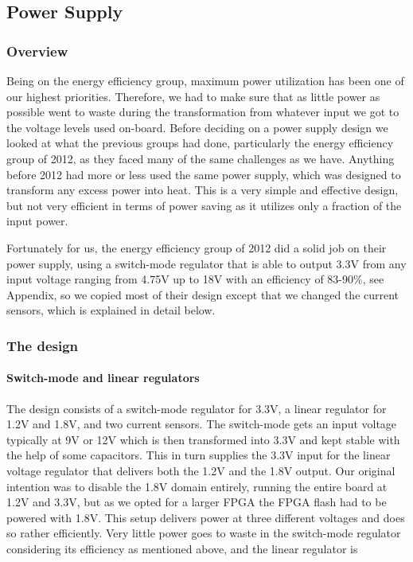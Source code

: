 \subsection{Power Supply}
\subsubsection{Overview}
Being on the energy efficiency group, maximum power utilization has been one of
our highest priorities. Therefore, we had to make sure that as little power as
possible went to waste during the transformation from whatever input we got to
the voltage levels used on-board. Before deciding on a power supply design we
looked at what the previous groups had done, particularly the energy efficiency
group of 2012, as they faced many of the same challenges as we have. Anything
before 2012 had more or less used the same power supply, which was
designed to transform any excess power into heat. This is a very simple and
effective design, but not very efficient in terms of power saving as it utilizes
only a fraction of the input power.

Fortunately for us, the energy efficiency group of 2012 did a solid job on their
power supply, using a switch-mode regulator that is able to output 3.3V from
any input voltage ranging from 4.75V up to 18V with an efficiency of 83-90\%, see
Appendix, so we copied most of their design
except that we changed the current sensors, which is explained in detail below.

\subsubsection{The design}
\paragraph{Switch-mode and linear regulators}
The design consists of a switch-mode regulator for 3.3V, a linear regulator for
1.2V and 1.8V, and two current sensors. The switch-mode gets 
an input voltage typically at
9V or 12V which is then transformed into 3.3V and kept stable with the help of
some capacitors. This in turn supplies the 3.3V input for the linear voltage
regulator that delivers both the 1.2V and the 1.8V output. Our original
intention was to disable the 1.8V domain entirely, running the entire board at
1.2V and 3.3V, but as we opted for a larger FPGA the FPGA flash had to be
powered with 1.8V. This setup delivers power at three different voltages and
does so rather efficiently. Very little power goes to waste in the switch-mode
regulator considering its efficiency as mentioned above, and the linear
regulator is 

